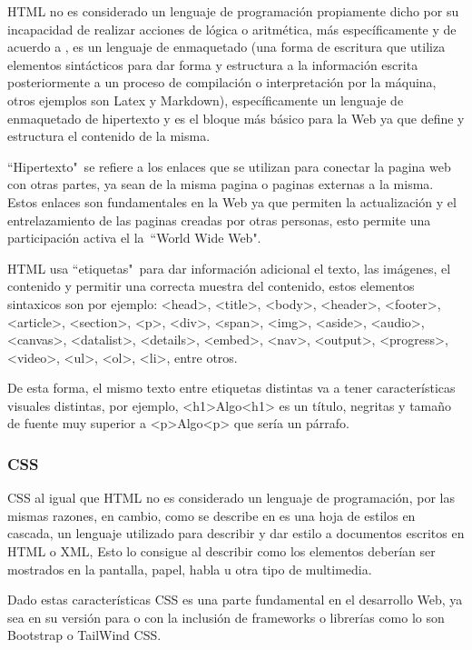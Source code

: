 HTML no es considerado un lenguaje de programación propiamente dicho por su
incapacidad de realizar acciones de lógica o aritmética, más específicamente y
de acuerdo a \cite{HTML},
es un lenguaje de enmaquetado (una forma de escritura que utiliza elementos
sintácticos para dar forma y estructura a la información escrita posteriormente
a un proceso de  compilación o interpretación por la máquina, otros ejemplos son
Latex y Markdown), específicamente un lenguaje de enmaquetado de hipertexto y es
el bloque más básico para la Web ya que define y estructura el contenido de la
misma.

``Hipertexto"\  se refiere a los enlaces que se utilizan para conectar la pagina
web con otras partes, ya sean de la misma pagina o paginas externas a la misma.
Estos enlaces son fundamentales en la Web ya que permiten la actualización y el
entrelazamiento de las paginas creadas por otras personas, esto permite
una participación activa el la\  ``World Wide Web".

HTML usa ``etiquetas"\  para dar información adicional  el texto, las imágenes,
el contenido y permitir
una correcta muestra del contenido, estos elementos sintaxicos son por ejemplo:
 <head>, <title>, <body>, <header>, <footer>, <article>, <section>, <p>, <div>,
 <span>, <img>, <aside>, <audio>, <canvas>, <datalist>, <details>, <embed>,
 <nav>, <output>, <progress>, <video>, <ul>, <ol>, <li>, entre otros.

 De esta forma, el mismo texto entre etiquetas distintas va a tener características
 visuales distintas, por ejemplo, <h1>Algo<h1> es un título, negritas y tamaño de
 fuente muy superior a <p>Algo<p> que sería un párrafo.


\subsubsection{CSS}

CSS al igual que HTML no es considerado un lenguaje de programación, por las mismas
razones, en cambio, como se describe en \cite{CSS} es una hoja de estilos en cascada,
un lenguaje utilizado para describir y dar estilo a documentos escritos en HTML o
XML, Esto lo consigue al describir como los elementos deberían ser mostrados en la
pantalla, papel, habla u otra tipo de multimedia.

Dado estas características CSS es una parte fundamental en el desarrollo Web, ya
sea en su versión para o con la inclusión de frameworks o librerías como lo son
Bootstrap o TailWind CSS.

